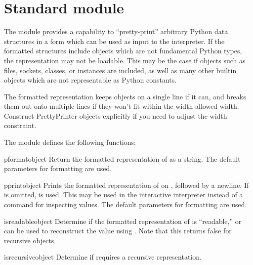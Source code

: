 
\section{Standard module }

The  module provides a capability to ``pretty-print''
arbitrary Python data structures in a form which can be used as input
to the interpreter.  If the formatted structures include objects which
are not fundamental Python types, the representation may not be
loadable.  This may be the case if objects such as files, sockets,
classes, or instances are included, as well as many other builtin
objects which are not representable as Python constants.

The formatted representation keeps objects on a single line if it can,
and breaks them out onto multiple lines if they won't fit within the
width allowed width.  Construct PrettyPrinter objects explicitly if
you need to adjust the width constraint.

The  module defines the following functions:

\renewcommand{\indexsubitem}{(in module pprint)}

\begin{funcdesc}{pformat}{object}
Return the formatted representation of  as a string.  The
default parameters for formatting are used.
\end{funcdesc}

\begin{funcdesc}{pprint}{object}
Prints the formatted representation of  on ,
followed by a newline.  If  is omitted, 
is used.  This may be used in the interactive interpreter instead of a
 command for inspecting values.  The default parameters
for formatting are used.
\end{funcdesc}

\begin{funcdesc}{isreadable}{object}
Determine if the formatted representation of  is
``readable,'' or can be used to reconstruct the value using
.  Note that this returns false for recursive objects.
\end{funcdesc}

\begin{funcdesc}{isrecursive}{object}
Determine if  requires a recursive representation.
\end{funcdesc}

